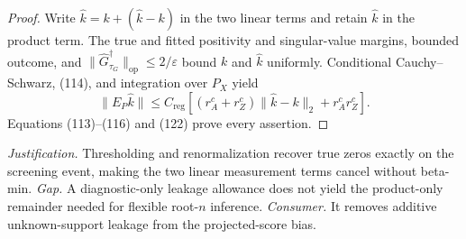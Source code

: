 \documentclass{article}
\begin{document}
\begin{proof}
Write \(\widehat k=k+(\widehat k-k)\) in the two linear terms and retain \(\widehat k\) in the product term.  The true and fitted positivity and singular-value margins, bounded outcome, and
\(\|\widehat G_{\tau_G}^{\dagger}\|_{\mathrm{op}}\leq2/\varepsilon\)
bound \(k\) and \(\widehat k\) uniformly.  Conditional Cauchy--Schwarz, (114), and integration over \(P_X\) yield
\[
 \|E_P\widehat k\|
 \leq C_{\mathrm{reg}}
 \left[(r_A^c+r_Z^c)\|\widehat k-k\|_2+r_A^cr_Z^c\right]. \tag{122}
\]
Equations (113)--(116) and (122) prove every assertion.
\end{proof}
\par\smallskip\noindent \textit{Justification.} Thresholding and renormalization recover true zeros exactly on the screening event, making the two linear measurement terms cancel without beta-min. \textit{Gap.} A diagnostic-only leakage allowance does not yield the product-only remainder needed for flexible root-\(n\) inference. \textit{Consumer.} It removes additive unknown-support leakage from the projected-score bias.
\end{document}
